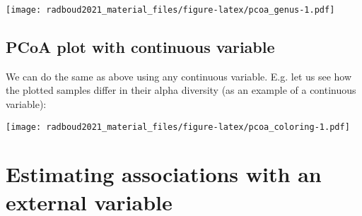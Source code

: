 \documentclass[
  oneside]{book}
\newenvironment{Shaded}{\begin{snugshade}}{\end{snugshade}}
\newcommand{\CommentTok}[1]{\textcolor[rgb]{0.56,0.35,0.01}{\textit{#1}}}
\newcommand{\DataTypeTok}[1]{\textcolor[rgb]{0.13,0.29,0.53}{#1}}
\newcommand{\DecValTok}[1]{\textcolor[rgb]{0.00,0.00,0.81}{#1}}
\newcommand{\KeywordTok}[1]{\textcolor[rgb]{0.13,0.29,0.53}{\textbf{#1}}}
\newcommand{\NormalTok}[1]{#1}
\newcommand{\OperatorTok}[1]{\textcolor[rgb]{0.81,0.36,0.00}{\textbf{#1}}}
\newcommand{\StringTok}[1]{\textcolor[rgb]{0.31,0.60,0.02}{#1}}
\begin{document}
\texttt{[image: radboud2021\_material\_files/figure-latex/pcoa\_genus-1.pdf]}

\hypertarget{pcoa-plot-with-continuous-variable}{%
\subsection{PCoA plot with continuous variable}\label{pcoa-plot-with-continuous-variable}}

We can do the same as above using any continuous variable. E.g. let us
see how the plotted samples differ in their alpha diversity (as an
example of a continuous variable):

\begin{Shaded}
\end{Shaded}

\texttt{[image: radboud2021\_material\_files/figure-latex/pcoa\_coloring-1.pdf]}

\hypertarget{estimating-associations-with-an-external-variable}{%
\section{Estimating associations with an external variable}\label{estimating-associations-with-an-external-variable}}
\end{document}
